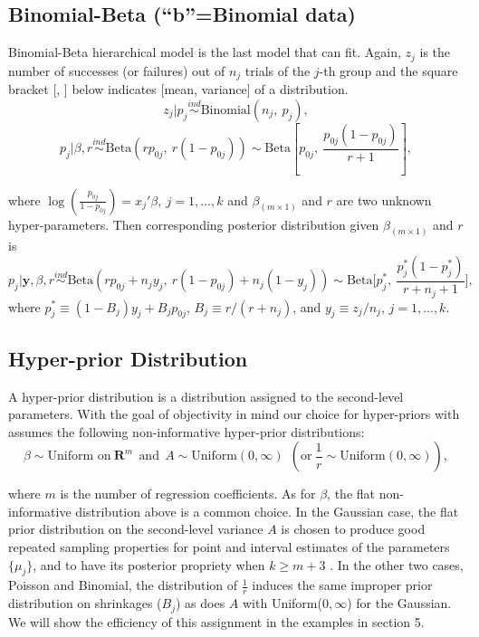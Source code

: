 \documentclass[article]{jss}
\begin{document}
\subsection[Binomial-Beta]{Binomial-Beta (``b''=Binomial data)}
Binomial-Beta hierarchical model is the last model that  can fit. Again, $z_{j}$ is the number of successes (or failures) out of $n_{j}$ trials of the $j$-th group and the square bracket [, ] below indicates [mean, variance] of a distribution.
\begin{equation}
z_{j} \vert p_{j}\stackrel{ind}{\sim}\textrm{Binomial}(n_{j}, ~p_{j}),
\end{equation}
\begin{equation}
p_{j} \vert \beta, r\stackrel{ind}{\sim}\textrm{Beta}(rp_{0j},~ r(1-p_{0j}))\sim \textrm{Beta} \left[p_{0j}, ~\frac{p_{0j}(1-p_{0j})}{r + 1} \right],
\end{equation}

where $\log(\frac{p_{0j}}{1-p_{0j}}) =x_{j}'\beta, ~j=1, \ldots, k$ and $\beta_{(m\times1)}$ and $r$ are two unknown hyper-parameters. Then corresponding posterior distribution given  $\beta_{(m\times1)}$ and $r$ is
\begin{equation} \label{betapost}
p_{j}\vert \textbf{y}, \beta, r \stackrel{ind}{\sim}\textrm{Beta}(rp_{0j}+n_{j}y_{j},~r(1-p_{0j})+n_{j}(1-y_{j}))\sim\textrm{Beta}\bigg[p^{\ast}_{j},~ \frac{p^{\ast}_{j}(1-p^{\ast}_{j})}{r+n_{j}+1}\bigg],
\end{equation}
where $p^{\ast}_{j}\equiv(1-B_{j})y_{j}+B_{j}p_{0j}$, $B_{j}\equiv r/ (r+n_{j})$, and $y_{j}\equiv z_{j} / n_{j}$, $j=1,\ldots,k$.


\subsection[Hyper-prior Distribution]{Hyper-prior Distribution}
A hyper-prior distribution is a distribution assigned to the second-level parameters. With the goal of objectivity in mind our choice for hyper-priors with  assumes the following non-informative hyper-prior distributions:
\begin{equation}
\beta \sim \textrm{Uniform on}~ \mathbf{R}^{m}~~\textrm{and}~~A \sim \textrm{Uniform}(0, \infty) ~~(\textrm{or} ~\frac{1}{r}\sim \textrm{Uniform}(0, \infty)),
\end{equation}

where $m$ is the number of regression coefficients. As for $\beta$, the flat non-informative distribution above is a common choice. In the Gaussian case, the flat prior distribution on the second-level variance $A$ is chosen to produce good repeated sampling properties for point and interval estimates of the parameters $\{\mu_{j}\}$, and to have its posterior propriety when $k\ge m+3$ \citep{2011}. In the other two cases, Poisson and Binomial, the distribution of $\frac{1}{r}$ induces the same improper prior distribution on shrinkages ($B_{j}$) as does $A$ with Uniform($0, \infty$) for the Gaussian. We will show the efficiency of this assignment  in the examples in section 5.
\end{document}
